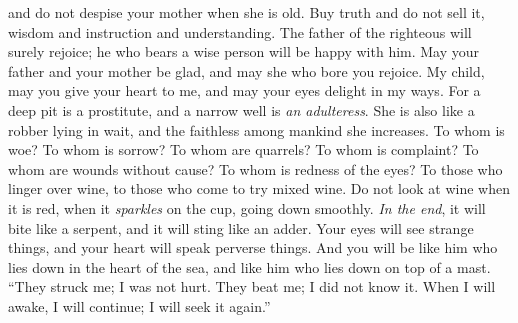 \begin{biblechapter}
and do not despise your mother when she is old.
\verse Buy truth and do not sell it, 
wisdom and instruction and understanding.
\verse The father of the righteous will surely rejoice; 
he who bears a wise person will be happy with him.
\verse May your father and your mother be glad, 
and may she who bore you rejoice.
\verse My child, may you give your heart to me, 
and may your eyes delight in my ways.
\verse For a deep pit is a prostitute, 
and a narrow well is \textit{an adulteress}.
\verse She is also like a robber lying in wait, 
and the faithless among mankind she increases.
\verse To whom is woe? To whom is sorrow? To whom are quarrels? To whom is complaint? 
To whom are wounds without cause? To whom is redness of the eyes?
\verse To those who linger over wine, 
to those who come to try mixed wine.
\verse Do not look at wine when it is red, 
when it \textit{sparkles} on the cup, 
going down smoothly.
\verse \textit{In the end}, it will bite like a serpent, 
and it will sting like an adder.
\verse Your eyes will see strange things, 
and your heart will speak perverse things.
\verse And you will be like him who lies down in the heart of the sea, 
and like him who lies down on top of a mast.
\verse “They struck me; I was not hurt. They beat me; I did not know it. 
When I will awake, I will continue; I will seek it again.”
\end{biblechapter}

